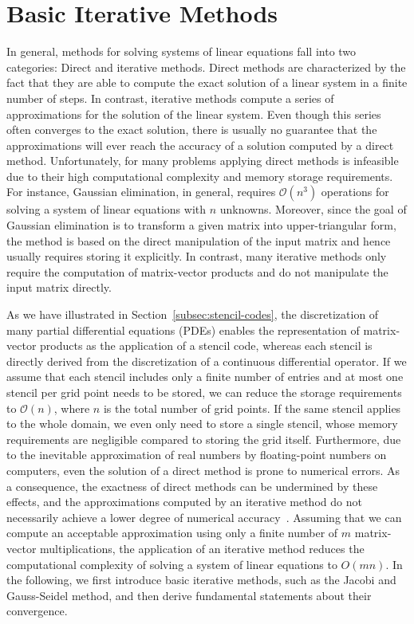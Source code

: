 \section{Basic Iterative Methods}
\label{sec:basic-iterative-methods}
In general, methods for solving systems of linear equations fall into two categories: Direct and iterative methods.
Direct methods are characterized by the fact that they are able to compute the exact solution of a linear system in a finite number of steps.
In contrast, iterative methods compute a series of approximations for the solution of the linear system.
Even though this series often converges to the exact solution, there is usually no guarantee that the approximations will ever reach the accuracy of a solution computed by a direct method.
Unfortunately, for many problems applying direct methods is infeasible due to their high computational complexity and memory storage requirements.
For instance, Gaussian elimination, in general, requires $\mathcal O(n^3)$ operations for solving a system of linear equations with $n$ unknowns.
Moreover, since the goal of Gaussian elimination is to transform a given matrix into upper-triangular form, the method is based on the direct manipulation of the input matrix and hence usually requires storing it explicitly.
In contrast, many iterative methods only require the computation of matrix-vector products and do not manipulate the input matrix directly.

As we have illustrated in Section~\ref{subsec:stencil-codes}, the discretization of many partial differential equations (PDEs) enables the representation of matrix-vector products as the application of a stencil code, whereas each stencil is directly derived from the discretization of a continuous differential operator.
If we assume that each stencil includes only a finite number of entries and at most one stencil per grid point needs to be stored, we can reduce the storage requirements to $\mathcal{O}(n)$, where $n$ is the total number of grid points.
If the same stencil applies to the whole domain, we even only need to store a single stencil, whose memory requirements are negligible compared to storing the grid itself.
Furthermore, due to the inevitable approximation of real numbers by floating-point numbers on computers, even the solution of a direct method is prone to numerical errors.
As a consequence, the exactness of direct methods can be undermined by these effects, and the approximations computed by an iterative method do not necessarily achieve a lower degree of numerical accuracy~\cite{higham2002accuracy}.
Assuming that we can compute an acceptable approximation using only a finite number of $m$ matrix-vector multiplications, the application of an iterative method reduces the computational complexity of solving a system of linear equations to $O(mn)$.
In the following, we first introduce basic iterative methods, such as the Jacobi and Gauss-Seidel method, and then derive fundamental statements about their convergence. 
